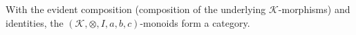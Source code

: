 With the evident composition (composition of the underlying $\mathcal{K}$-morphisms) and identities, the $(\mathcal{K}, \otimes, I, a, b, c)$-monoids form a category.
